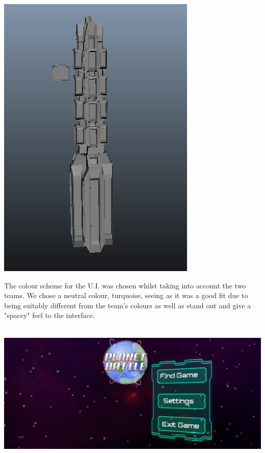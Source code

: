 \documentclass[11pt,a4paper]{article}
\begin{document}
\begin{center}
        \includegraphics[scale=0.2]{logos/file7.png}\\
\end{center}

\noindent
        The colour scheme for the U.I. was chosen whilst taking into account the two teams. We chose a neutral colour, turquoise, seeing as it was a good fit due to being suitably different from the team's colours as well as stand out and give a "spacey" feel to the interface. \\ \\
\begin{center}
\includegraphics[scale=0.2]{logos/UI.png}\\
\end{center}
\end{document}
